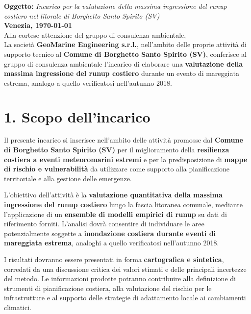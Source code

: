 \documentclass[11pt,a4paper,roman]{moderncv}
\begin{document}
\date{\today}
\makelettertitle

\noindent
\textbf{Oggetto:} \textit{Incarico per la valutazione della massima ingressione del runup costiero nel litorale di Borghetto Santo Spirito (SV)} \\[0.5em]

\noindent
\textbf{Venezia, \today} \\[1em]

Alla cortese attenzione del gruppo di consulenza ambientale, \\[0.5em]

La società \textbf{GeoMarine Engineering s.r.l.}, nell’ambito delle proprie attività di supporto tecnico al \textbf{Comune di Borghetto Santo Spirito (SV)}, conferisce al gruppo di consulenza ambientale l’incarico di elaborare una \textbf{valutazione della massima ingressione del runup costiero} durante un evento di mareggiata estrema, analogo a quello verificatosi nell’autunno 2018.

\section*{1. Scopo dell’incarico}
Il presente incarico si inserisce nell’ambito delle attività promosse dal \textbf{Comune di Borghetto Santo Spirito (SV)} per il miglioramento della \textbf{resilienza costiera a eventi meteoromarini estremi} e per la predisposizione di \textbf{mappe di rischio e vulnerabilità} da utilizzare come supporto alla pianificazione territoriale e alla gestione delle emergenze.

L’obiettivo dell’attività è la \textbf{valutazione quantitativa della massima ingressione del runup costiero} lungo la fascia litoranea comunale, mediante l’applicazione di un \textbf{ensemble di modelli empirici di runup} su dati di riferimento forniti.  
L’analisi dovrà consentire di individuare le aree potenzialmente soggette a \textbf{inondazione costiera durante eventi di mareggiata estrema}, analoghi a quello verificatosi nell’autunno 2018.

I risultati dovranno essere presentati in forma \textbf{cartografica e sintetica}, corredati da una discussione critica dei valori stimati e delle principali incertezze del metodo.  
Le informazioni prodotte potranno contribuire alla definizione di strumenti di pianificazione costiera, alla valutazione del rischio per le infrastrutture e al supporto delle strategie di adattamento locale ai cambiamenti climatici.
\end{document}
